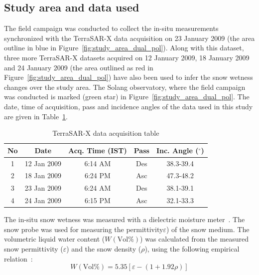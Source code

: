 \subsection{Study area and data used}
\label{sec:4.1.1}
The field campaign was conducted to collect the in-situ measurements synchronized with the TerraSAR-X data acquisition on 23 January 2009 (the area outline in blue in Figure~\ref{fig:study_area_dual_pol}). Along with this dataset, three more TerraSAR-X datasets acquired on 12 January 2009, 18 January 2009 and 24 January 2009 (the area outlined as red in Figure~\ref{fig:study_area_dual_pol}) have also been used to infer the snow wetness changes over the study area. The Solang observatory, where the field campaign was conducted is marked (green star) in Figure~\ref{fig:study_area_dual_pol}. The date, time of acquisition, pass and incidence angles of the data used in this study are given in Table~\ref{table:data acquisition_sw_dual}.
\begin{table}[!htbp]
	\caption{TerraSAR-X data acquisition table}
	\begin{center}
		\begin{tabular}{| c | c |c | c |c |} \hline
			No & Date & Acq. Time (IST) & Pass & Inc. Angle ($^\circ$) \\ \hline \hline
			1 & 12 Jan 2009 & 6:14 AM & Des & 38.3-39.4\\ \hline
			2 & 18 Jan 2009 & 6:24 PM & Asc & 47.3-48.2\\ \hline
			3 & 23 Jan 2009 & 6:24 AM & Des & 38.1-39.1\\ \hline
			4 & 24 Jan 2009 & 6:15 PM & Asc & 32.1-33.3\\ \hline
		\end{tabular}
	\end{center}
	\label{table:data acquisition_sw_dual}
\end{table}
The in-situ snow wetness was measured with a dielectric moisture meter~\citep{denoth1989snow,denoth1995electron}. The snow probe was used for measuring the permittivity$\varepsilon$) of the snow medium. The volumetric liquid water content ($W(\mbox{Vol}\%)$) was calculated from the measured snow permittivity ($\varepsilon$) and the snow density ($\rho$), using the following empirical relation~\citep{denoth1995electron}:
\begin{equation}
W(\mbox{Vol}\%)=5.35\left[\varepsilon-(1+1.92\rho)\right]
\label{eq:denoth}
\end{equation}

